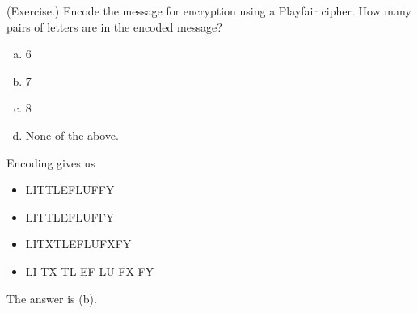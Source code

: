 \documentclass[letterpaper]{article}
\newcommand{\0}{\mathbf{0}}
\begin{document}
\begin{mdframed}
    (Exercise.) Encode the message  for encryption using a Playfair cipher. How many pairs of letters are in the encoded message? 

    \begin{enumerate}[(a)]
        \item 6
        \item 7
        \item 8
        \item None of the above. 
    \end{enumerate}

    \begin{mdframed}
        Encoding gives us 
        \begin{itemize}
            \item LITTLEFLUFFY
            \item LITTLEFLUFFY
            \item LITXTLEFLUFXFY
            \item LI TX TL EF LU FX FY
        \end{itemize}
        The answer is (b). 
    \end{mdframed}
\end{mdframed}
\end{document}
